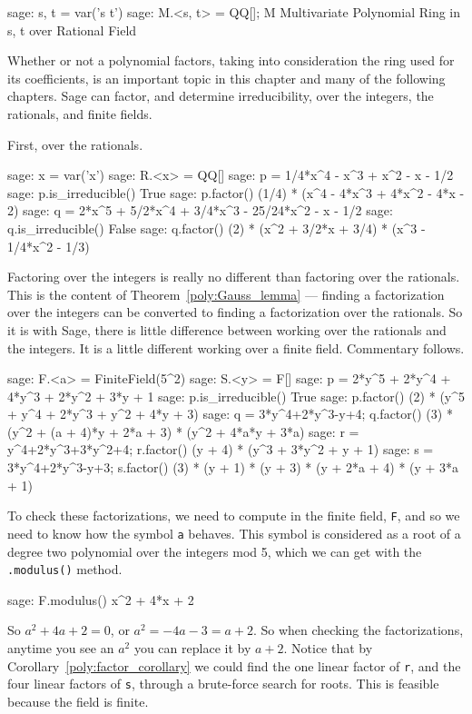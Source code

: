%
\begin{sageexample}
sage: s, t = var('s t')
sage: M.<s, t> = QQ[]; M
Multivariate Polynomial Ring in s, t over Rational Field
\end{sageexample}
%
%
Whether or not a polynomial factors, taking into consideration the ring used for its coefficients, is an important topic in this chapter and many of the following chapters.  Sage can factor, and determine irreducibility, over the integers, the rationals, and finite fields.\par
%
First, over the rationals.
%
\begin{sageexample}
sage: x = var('x')
sage: R.<x> = QQ[]
sage: p = 1/4*x^4 - x^3 + x^2 - x - 1/2
sage: p.is_irreducible()
True
sage: p.factor()
(1/4) * (x^4 - 4*x^3 + 4*x^2 - 4*x - 2)
sage: q = 2*x^5 + 5/2*x^4 + 3/4*x^3 - 25/24*x^2 - x - 1/2
sage: q.is_irreducible()
False
sage: q.factor()
(2) * (x^2 + 3/2*x + 3/4) * (x^3 - 1/4*x^2 - 1/3)
\end{sageexample}
%
Factoring over the integers is really no different than factoring over the rationals.  This is the content of Theorem~\ref{poly:Gauss_lemma} --- finding a factorization over the integers can be converted to finding a factorization over the rationals.  So it is with Sage, there is little difference between working over the rationals and the integers.  It is a little different working over a finite field.  Commentary follows.
%
\begin{sageexample}
sage: F.<a> = FiniteField(5^2)
sage: S.<y> = F[]
sage: p = 2*y^5 + 2*y^4 + 4*y^3 + 2*y^2 + 3*y + 1
sage: p.is_irreducible()
True
sage: p.factor()
(2) * (y^5 + y^4 + 2*y^3 + y^2 + 4*y + 3)
sage: q = 3*y^4+2*y^3-y+4; q.factor()
(3) * (y^2 + (a + 4)*y + 2*a + 3) * (y^2 + 4*a*y + 3*a)
sage: r = y^4+2*y^3+3*y^2+4; r.factor()
(y + 4) * (y^3 + 3*y^2 + y + 1)
sage: s = 3*y^4+2*y^3-y+3; s.factor()
(3) * (y + 1) * (y + 3) * (y + 2*a + 4) * (y + 3*a + 1)
\end{sageexample}
%
To check these factorizations, we need to compute in the finite field, \verb?F?, and so we need to know how the symbol \verb?a? behaves.  This symbol is considered as a root of a degree two polynomial over the integers mod 5, which we can get with the \verb?.modulus()? method.
%
\begin{sageexample}
sage: F.modulus()
x^2 + 4*x + 2
\end{sageexample}
%
So $a^2+4a+2=0$, or $a^2=-4a-3=a+2$.  So when checking the factorizations, anytime you see an $a^2$ you can replace it by $a+2$.  Notice that by Corollary~\ref{poly:factor_corollary} we could find the one linear factor of \verb?r?, and the four linear factors of \verb?s?, through a brute-force search for roots.  This is feasible because the field is finite.
